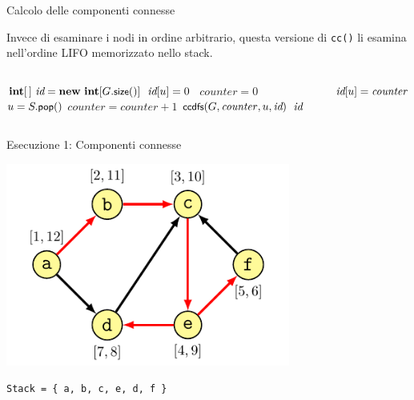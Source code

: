 \begin{frame}[fragile]{Calcolo delle componenti connesse}
 
Invece di esaminare i nodi in ordine arbitrario, questa versione di
\texttt{cc()} li esamina nell'ordine LIFO memorizzato nello stack.

\vspace{-12pt}
\begin{columns}[T]
\begin{Procedure}
\caption[A]{\connectedcomponents(\Graph $G$, \alert{$\Stack\ S$})}
$\INTEGER[\,]\ \components = \NEW\ \INTEGER[G.\fontproc{size}()]$\;
{
  $\textit{id}[u] = 0$
}
\INTEGER\ $\mathit{counter} = 0$\;
{
  \alert{$u = S.\textsf{{\small pop}}()$}\;
  {
    $\mathit{counter} = \mathit{counter}+1$\;
    $\textsf{{\small ccdfs}}(G, \mathit{counter}, u, \textit{id})$\;
  }
}
\Return $\textit{id}$\;
\end{Procedure}
\begin{Procedure}
\caption[A]{\ccdfs(\Graph $G$, \INTEGER\ $\mathit{counter}$, \Node\ $u$, $\INTEGER[\,]\ \components$)}
$\textit{id}[u] = \mathit{counter}$\;
{
}
\end{Procedure}
\end{columns}
\end{frame}

\begin{frame}{Esecuzione 1: Componenti connesse}
    

\begin{overprint}
\centering\includegraphics[width=0.7\textwidth,page=4]{scc3.pdf}
\end{overprint}
\Large
\texttt{Stack = \{ a, b, c, e, d, f \} }

\end{frame}



